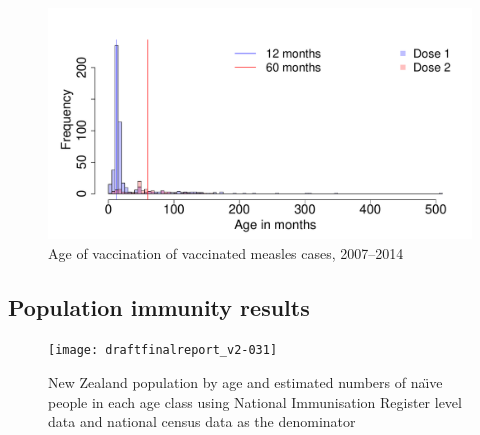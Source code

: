 \documentclass{article}
\begin{document}
\begin{figure}
\begin{center}
\includegraphics{draftfinalreport_v2-029}
\end{center}
\caption{Age of vaccination of vaccinated measles cases, 2007--2014}
\label{fig:vaccstat}
\end{figure}

\subsection{Population immunity results}
\label{sub:popim}


\begin{figure}
\begin{center}
\texttt{[image: draftfinalreport\_v2-031]}
\end{center}
\caption{New Zealand population by age and estimated numbers of na\"{\i}ve people in each age class using National Immunisation Register level data and national census data as the denominator}
\label{fig:naive_au}
\end{figure}
\end{document}
